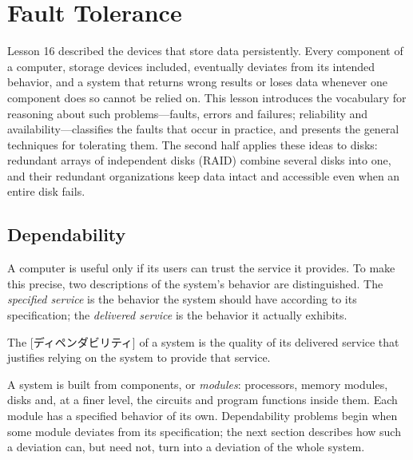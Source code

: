 \documentclass[../main.tex]{subfiles}
\begin{document}
\chapter{Fault Tolerance}

Lesson 16 described the devices that store data persistently.  Every
component of a computer, storage devices included, eventually deviates from
its intended behavior, and a system that returns wrong results or loses data
whenever one component does so cannot be relied on.  This lesson introduces
the vocabulary for reasoning about such problems---faults, errors and
failures; reliability and availability---classifies the faults that occur in
practice, and presents the general techniques for tolerating them.  The
second half applies these ideas to disks: redundant arrays of independent
disks (RAID) combine several disks into one, and their redundant
organizations keep data intact and accessible even when an entire disk
fails.

\section{Dependability}
\label{sec:l17-dependability}

A computer is useful only if its users can trust the service it
provides.  To make this precise, two descriptions of the
system's behavior are distinguished.  The \emph{specified service} is the
behavior the system should have according to its specification; the
\emph{delivered service} is the behavior it actually exhibits.

\begin{definition}[Dependability]
  The [ディペンダビリティ] of a system is the quality of
  its delivered service that justifies relying on the system to provide that
  service.
\end{definition}

A system is built from components, or \emph{modules}: processors, memory
modules, disks and, at a finer level, the circuits and program functions
inside them.  Each module has a specified behavior of its own.
Dependability problems begin when some module deviates from its
specification; the next section describes how such a deviation can, but need
not, turn into a deviation of the whole system.
\end{document}
